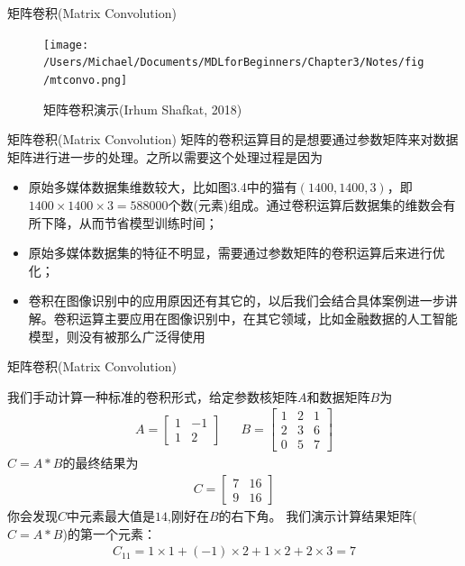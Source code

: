 \documentclass[handout]{beamer}
\begin{document}
\begin{frame}{矩阵卷积(Matrix Convolution)}
\begin{figure}[H]
	\centering
	\texttt{[image: /Users/Michael/Documents/MDLforBeginners/Chapter3/Notes/fig/mtconvo.png]}
	\caption{矩阵卷积演示(Irhum Shafkat, 2018)}
\end{figure}
\end{frame}

\begin{frame}{矩阵卷积(Matrix Convolution)}
矩阵的卷积运算目的是想要通过参数矩阵来对数据矩阵进行进一步的处理。之所以需要这个处理过程是因为
	\begin{itemize}
	\setlength\itemsep{1em}
		\item 原始多媒体数据集维数较大，比如图3.4中的猫有$(1400, 1400, 3)$，即$1400 \times 1400 \times 3 = 588000$个数(元素)组成。通过卷积运算后数据集的维数会有所下降，从而节省模型训练时间；
		\item 原始多媒体数据集的特征不明显，需要通过参数矩阵的卷积运算后来进行优化；
		\item 卷积在图像识别中的应用原因还有其它的，以后我们会结合具体案例进一步讲解。卷积运算主要应用在图像识别中，在其它领域，比如金融数据的人工智能模型，则没有被那么广泛得使用
	\end{itemize}
\end{frame}

\begin{frame}{矩阵卷积(Matrix Convolution)}
\begin{example}
{\footnotesize
我们手动计算一种标准的卷积形式，给定参数核矩阵$A$和数据矩阵$B$为
\begin{align*}
	A = \begin{bmatrix}
		1 & -1 \\
		1 & 2 
	\end{bmatrix} & & B= \begin{bmatrix}
		1 & 2 & 1 \\
		2 & 3 & 6 \\
		0 & 5 & 7 
	\end{bmatrix}
\end{align*}	
$C=A*B$的最终结果为\begin{align*}
	C = \begin{bmatrix}
		7 & 16 \\
		9 & 16 
	\end{bmatrix}
\end{align*} 你会发现$C$中元素最大值是$14$,刚好在$B$的右下角。
我们演示计算结果矩阵($C = A*B$)的第一个元素：
\begin{align*}
	C_{11} = 1\times 1 + (-1) \times 2 + 1 \times 2 + 2 \times 3 = 7 
\end{align*}
}
\end{example}
\end{frame}
\end{document}
